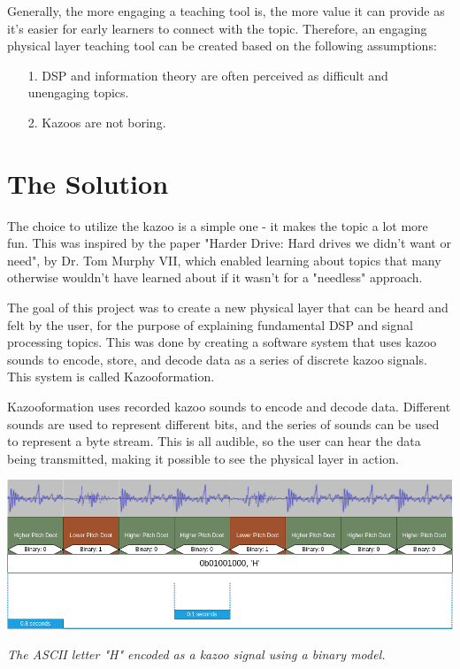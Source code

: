 \documentclass[]{article}
\begin{document}
Generally, the more engaging a teaching tool is, the more value it can provide as it's easier for early learners to connect with the topic. Therefore, an engaging physical layer teaching tool can be created based on the following assumptions:

\begin{itemize}
  \item[1.] DSP and information theory are often perceived as difficult and unengaging topics.
  \item[2.] Kazoos are not boring.
\end{itemize}

\section{The Solution}



The choice to utilize the kazoo is a simple one - it makes the topic a lot more fun. This was inspired by the paper "Harder Drive: Hard drives we didn't want or need", by Dr. Tom Murphy VII, which enabled learning about topics that many otherwise wouldn't have learned about if it wasn't for a "needless"\cite{murphy2022harder} approach.

The goal of this project was to create a new physical layer that can be heard and felt by the user, for the purpose of explaining fundamental DSP and signal processing topics. This was done by creating a software system that uses kazoo sounds to encode, store, and decode data as a series of discrete kazoo signals. This system is called Kazooformation.

Kazooformation uses recorded kazoo sounds to encode and decode data. Different
sounds are used to represent different bits, and the series of sounds can be
used to represent a byte stream. This is all audible, so the user can hear the
data being transmitted, making it possible to see the physical layer in action.

\begin{center}
  \includegraphics[width=0.7\linewidth]{images/kazoo_signal.png}

  \textit{The ASCII letter "H" encoded as a kazoo signal using a binary model.}
\end{center}
\end{document}
